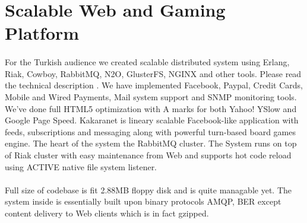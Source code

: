 \documentclass[11pt]{article}
\begin{document}



\section*{Scalable Web and Gaming Platform}
\paragraph{}
    For the Turkish audience we created scalable distributed system using Erlang, Riak,
    Cowboy, RabbitMQ, N2O, GlusterFS, NGINX and other tools.
    Please read the technical description
    .
    We have implemented Facebook, Paypal, Credit Cards, Mobile and Wired Payments,
    Mail system support and SNMP monitoring tools. We've done full HTML5 optimization
    with A marks for both Yahoo! YSlow and Google Page Speed. Kakaranet is lineary scalable
    Facebook-like application with feeds, subscriptions and messaging along with
    powerful turn-based board games engine. The heart of the system the RabbitMQ
    cluster. The System runs on top of Riak cluster with easy maintenance from Web
    and supports hot code reload using ACTIVE native file system listener.



\paragraph{}
    Full size of codebase is fit 2.88MB floppy disk and is quite managable yet.
    The system inside is essentially built upon binary protocols AMQP, BER
    except content delivery to Web clients which is in fact gzipped.



\end{document}

